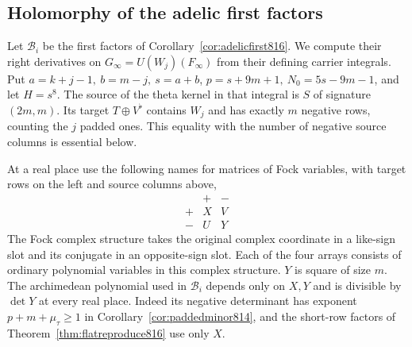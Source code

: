 \documentclass[a4paper,11pt]{article}
\theoremstyle{definition}
\theoremstyle{remark}
\numberwithin{equation}{section}
\begin{document}
\subsection{Holomorphy of the adelic first factors}
\label{sec:carrierholomorphy817}
Let \(\mathcal B_i\) be the first factors of
Corollary~\ref{cor:adelicfirst816}. We compute their right
derivatives on \(G_\infty=U(W_j)(F_\infty)\) from their defining carrier
integrals. Put \(a=k+j-1,\ b=m-j,\ s=a+b\),
\(p=s+9m+1,\ N_0=5s-9m-1\), and let \(H=s^8\).
The source of the theta kernel in that integral is
\(S\) of signature \((2m,m)\). Its target
\(T\oplus V^\flat\) contains \(W_j\) and has exactly \(m\)
negative rows, counting the \(j\) padded ones. This equality
with the number of negative source columns is essential below.

At a real place use the following names for matrices of Fock
variables, with target rows on the left and source columns above,
\[
\begin{array}{c|cc}
         & + & -\\ \hline
 +       & X & V\\
 -       & U & Y
\end{array}
\]
The Fock complex structure takes the original complex
coordinate in a like-sign slot and its conjugate in an
opposite-sign slot. Each of the four arrays consists of
ordinary polynomial variables in this complex structure.
\(Y\) is square of size \(m\). The archimedean polynomial
used in \(\mathcal B_i\) depends only on \(X,Y\) and is
divisible by \(\det Y\) at every real place. Indeed its
negative determinant has exponent \(p+m+\mu_\tau\ge1\)
in Corollary~\ref{cor:paddedminor814}, and the short-row
factors of Theorem~\ref{thm:flatreproduce816} use only \(X\).
\end{document}
